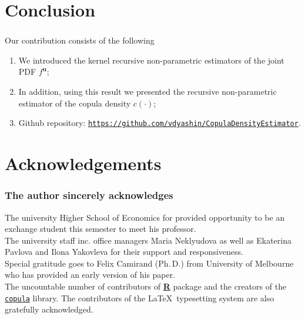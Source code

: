 \documentclass[aspectratio=169]{beamer}
\begin{document}
\section{Conclusion}
	\begin{frame}
		\frametitle{\insertsection}
		
		Our contribution consists of the following
		\begin{enumerate}
			\item<1-> We introduced the kernel recursive non-parametric estimators of the joint PDF $ f^\mathbf{u} $;
			\item<2-> In addition, using this result we presented the recursive non-parametric estimator of the copula density $ c(\cdot) $;
			\item<3-> Github repository: \href{https://github.com/vdyashin/CopulaDensityEstimator}{\color{blue}\texttt{https://github.com/vdyashin/CopulaDensityEstimator}}.
		\end{enumerate}
		
	\end{frame}
	
\section{Acknowledgements}
	\begin{frame}
		\frametitle{The author sincerely acknowledges}
		
		The university Higher School of Economics for provided opportunity to be an exchange student this semester to meet his professor. \\[1em]
		
		The university staff inc. office managers Maria Neklyudova as well as Ekaterina Pavlova and Ilona Yakovleva for their support and responsiveness. \\[1em]
		
		Special gratitude goes to Felix Camirand (Ph.\,D.) from University of Melbourne who has provided an early version of his paper.\\[1em]
		
		The uncountable number of contributors of \href{https://R-project.org/}{\textbf{R}} package and the creators of the \href{https://cran.r-project.org/web/packages/copula/copula.pdf}{\texttt{copula}} library. The contributors of the \LaTeX~typesetting system are also gratefully acknowledged. 
		
	\end{frame}
			
\section{}
	\maketitle
	
\end{document}
